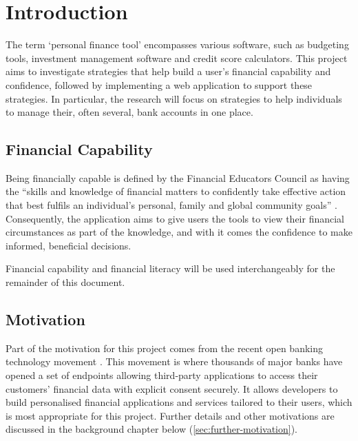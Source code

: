 \chapter{Introduction}
\label{ch:introduction}
The term `personal finance tool' encompasses various software, such as budgeting tools, investment management software and credit score calculators. This project aims to investigate strategies that help build a user's financial capability and confidence, followed by implementing a web application to support these strategies. In particular, the research will focus on strategies to help individuals to manage their, often several, bank accounts in one place.

\section{Financial Capability}
Being financially capable is defined by the Financial Educators Council as having the ``skills and knowledge of financial matters to confidently take effective action that best fulfils an individual's personal, family and global community goals'' \cite{FinancialEducatorsCouncil}. Consequently, the application aims to give users the tools to view their financial circumstances as part of the knowledge, and with it comes the confidence to make informed, beneficial decisions.

Financial capability and financial literacy will be used interchangeably for the remainder of this document.

\section{Motivation}
Part of the motivation for this project comes from the recent open banking technology movement \cite{OpenBanking}. This movement is where thousands of major banks have opened a set of endpoints allowing third-party applications to access their customers' financial data with explicit consent securely. It allows developers to build personalised financial applications and services tailored to their users, which is most appropriate for this project. Further details and other motivations are discussed in the background chapter below (\ref{sec:further-motivation}).
